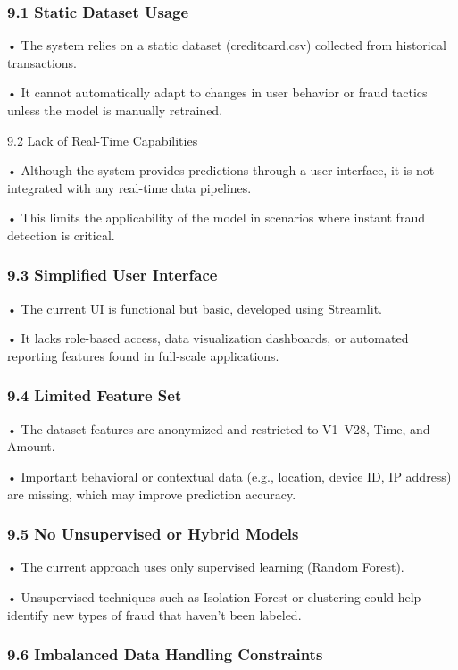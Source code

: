 \documentclass[11pt,a4paper]{article}
\begin{document}
\subsubsection*{9.1 Static Dataset Usage }

• 
The system relies on a static dataset (creditcard.csv) collected from historical transactions. 

• 
It cannot automatically adapt to changes in user behavior or fraud tactics unless the model is 
manually retrained. 

9.2 Lack of Real-Time Capabilities 

• 
Although the system provides predictions through a user interface, it is not integrated with 
any real-time data pipelines. 

• 
This limits the applicability of the model in scenarios where instant fraud detection is 
critical. 

\subsubsection*{9.3 Simplified User Interface }

• 
The current UI is functional but basic, developed using Streamlit. 

• 
It lacks role-based access, data visualization dashboards, or automated reporting features 
found in full-scale applications. 

\subsubsection*{9.4 Limited Feature Set }

• 
The dataset features are anonymized and restricted to V1–V28, Time, and Amount. 

• 
Important behavioral or contextual data (e.g., location, device ID, IP address) are missing, 
which may improve prediction accuracy. 

\subsubsection*{9.5 No Unsupervised or Hybrid Models }

• 
The current approach uses only supervised learning (Random Forest). 

• 
Unsupervised techniques such as Isolation Forest or clustering could help identify new types 
of fraud that haven't been labeled. 

\subsubsection*{9.6 Imbalanced Data Handling Constraints }
\end{document}
